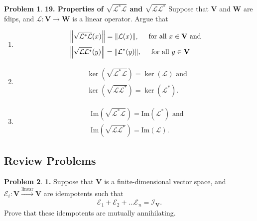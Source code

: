\documentclass{article}
\theoremstyle{definition}
\newtheorem*{prob*}{Problem}
\newcommand{\V}{\mathbf{V}}
\newcommand{\W}{\mathbf{W}}
\newcommand{\lag}{\mathcal{L}}
\newcommand{\E}{\mathcal{E}}
\newcommand{\ima}{\text{Im}}
\newcommand{\lin}{\overset{\text{linear}}{\longrightarrow}}
\begin{document}
\begin{prob*}\textbf{19. Properties of $\sqrt{\lag^*\lag}$ and $\sqrt{\lag\lag^*}$}
	Suppose that $\V$ and $\W$ are fdips, and $\lag : \V \to \W $ is a linear operator. Argue that 
	\begin{enumerate}
		\item \begin{align*}
		&\norm{\sqrt{\lag^*\lag}(x)} = \norm{\lag(x)}, \hspace{0.5cm}  \text{for all $x\in \V$ and}\\
		&\norm{\sqrt{\lag\lag^*}(y)} = \norm{\lag^*(y)}, \hspace{0.5cm}  \text{for all $y\in \V$}
		\end{align*}
		
		
		\item 
		\begin{align*}
		&\ker(\sqrt{\lag^*\lag}) = \ker(\lag) \text{ and }\\
		&\ker(\sqrt{\lag\lag^*}) = \ker(\lag^*).
		\end{align*}
		
		
		\item 
		\begin{align*}
		&\ima(\sqrt{\lag^*\lag}) = \ima(\lag^*) \text{ and }\\
		&\ima(\sqrt{\lag\lag^*}) = \ima(\lag).
		\end{align*}
	\end{enumerate}
	
\end{prob*}




\newpage




\subsection{Review Problems}




\begin{prob*}\textbf{1.} Suppose that $\V$ is a finite-dimensional vector space, and $\E_i : \V \lin \V$ are idempotents such that 
	\begin{align*}
	\E_1 + \E_2 + \dots \E_n = \mathcal{I}_\V.
	\end{align*}
	Prove that these idempotents are mutually annihilating.
	
\end{prob*}


\newpage
\end{document}

